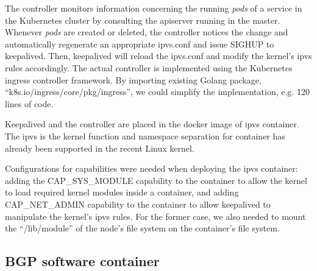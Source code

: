 The controller monitors information concerning the running {\em pods} of a service 
in the Kubernetes cluster by consulting the apiserver running in the master.
Whenever {\em pods} are created or deleted, the controller notices the change and automatically regenerate an appropriate ipvs.conf 
and issue SIGHUP to keepalived.
Then, keepalived will reload the ipvs.conf and modify the kernel's ipvs rules accordingly.
The actual controller\cite{ktaka_ccmp_2017_826894} is implemented using the Kubernetes ingress controller\cite{K8sIngress2017} framework. 
By importing existing Golang package, \enquote{k8s.io/ingress/core/pkg/ingress}, we could simplify the implementation, e.g. 
120 lines of code.  

Keepalived and the controller are placed in the docker image of ipvs container.
The ipvs is the kernel function and namespace separation for container has already been supported in the recent Linux kernel. 


Configurations for capabilities were needed when deploying the ipvs container: adding the CAP\_SYS\_MODULE capability 
to the container to allow the kernel to load required kernel modules inside a container, 
and adding CAP\_NET\_ADMIN capability to the container to allow keepalived to manipulate the kernel's ipvs rules. 
For the former case, we also needed to mount the \enquote{/lib/module} of the node's file system on the container's file system.

\subsection{BGP software container}

